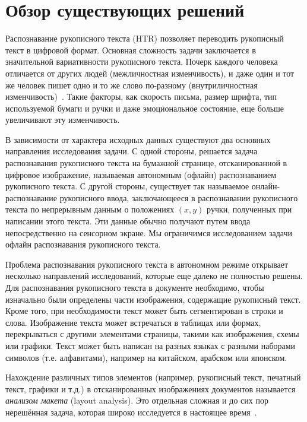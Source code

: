 \section{Обзор существующих решений}
\label{sec:Chapter2} 

Распознавание рукописного текста (HTR) позволяет переводить рукописный текст в цифровой формат.
Основная сложность задачи заключается в значительной вариативности рукописного текста.
Почерк каждого человека отличается от других людей (межличностная изменчивость),
и даже один и тот же человек пишет одно и то же слово по-разному (внутриличностная изменчивость)~\cite{sueiras2021continuous}.
Такие факторы, как скорость письма, размер шрифта, тип используемой бумаги и ручки и даже эмоциональное состояние,
еще больше увеличивают эту изменчивость.

В зависимости от характера исходных данных существуют два основных направления исследования задачи.
С одной стороны, решается задача распознавания рукописного текста на бумажной странице,
отсканированной в цифровое изображение, называемая автономным (офлайн) распознаванием рукописного текста.
С другой стороны, существует так называемое онлайн-распознавание рукописного ввода,
заключающееся в распознавании рукописного текста по непрерывным данным о положениях $(x, y)$ ручки,
полученных при написании этого текста.
Эти данные обычно получают путем ввода непосредственно на сенсорном экране.
Мы ограничимся исследованием задачи офлайн распознавания рукописного текста.

Проблема распознавания рукописного текста в автономном режиме открывает несколько направлений исследований, которые еще далеко не полностью решены.
Для распознавания рукописного текста в документе необходимо, чтобы изначально были определены части изображения, содержащие рукописный текст.
Кроме того, при необходимости текст может быть сегментирован в строки и слова.
Изображение текста может встречаться в таблицах или формах, перекрываться с другими элементами страницы, такими как изображения, схемы или графики.
Текст может быть написан на разных языках с разными наборами символов (т.е. алфавитами), например на китайском, арабском или японском.

Нахождение различных типов элементов (например, рукописный текст, печатный текст, графики и т.д.)
в отсканированных изображениях документов называется \textit{анализом макета} (layout analysis).
Это отдельная сложная и до сих пор нерешённая задача, которая широко исследуется в настоящее время~\cite{binmakhashen2019document}.


